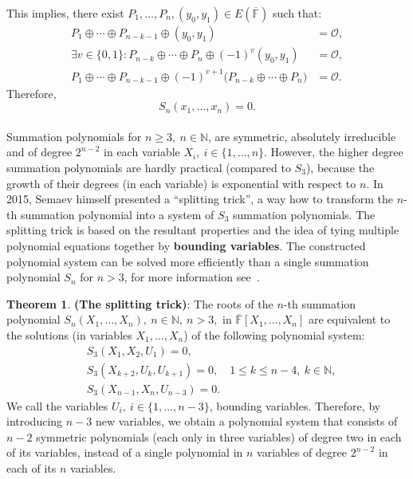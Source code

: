 \documentclass[thesis=M,english]{FITthesis}[2012/10/20]
\theoremstyle{remark}
\theoremstyle{definition}
\newtheorem{theorem}{Theorem}[section]
\begin{document}
This implies, there exist $P_1,\ldots,P_n, (y_0, y_1) \in E(\overline{\mathbb{F}})$ such that:
\begin{align*}
P_1 \oplus \cdots \oplus P_{n-k-1} \oplus (y_0,y_1) &= \mathcal{O}, \\
\exists v \in \{0,1\}: P_{n-k} \oplus \cdots \oplus P_{n} \oplus (-1)^{v}(y_0,y_1) &= \mathcal{O}, \\
P_1 \oplus \cdots \oplus P_{n-k-1} \oplus (-1)^{v+1}\bigg(P_{n-k} \oplus \cdots \oplus P_{n}\bigg) &= \mathcal{O}.
\end{align*}
Therefore, 
$$
S_n(x_1,\ldots,x_n) = 0.
$$
\\
\noindent Summation polynomials for $n \geq 3,\ n \in \mathbb{N}$, are symmetric, absolutely irreducible and of degree $2^{n-2}$ in each variable $X_i,\ i \in \{1,\ldots,n\}$.
However, the higher degree summation polynomials are hardly practical (compared to $S_3$), because the growth of their degrees (in each variable) is exponential with respect to $n$. In 2015, Semaev himself presented a \enquote{splitting trick}, a way how to transform the $n$-th summation polynomial into a  system of $S_3$ summation polynomials. The splitting trick is based on the resultant properties and the idea of tying multiple polynomial equations together by \textbf{bounding variables}. The constructed polynomial system can be solved more efficiently than a single summation polynomial $S_n$ for $n > 3$, for more information see~\cite{semaev15}. 
\begin{theorem}\textbf{(The splitting trick)}: The roots of the $n$-th summation polynomial $S_n(X_1,\ldots,X_n),\ n \in \mathbb{N},\ n > 3,$ in $\overline{\mathbb{F}}[X_1,\ldots,X_n]$ are equivalent to the solutions (in variables $X_1,\ldots,X_n$) of the following polynomial system:
\begin{align*}
&S_3(X_1,X_2,U_1) = 0, \\
&S_3(X_{k+2}, U_{k}, U_{k+1}) = 0, \quad 1 \leq k \leq n-4,\ k \in \mathbb{N}, \\
&S_3(X_{n-1}, X_n, U_{n-3}) = 0.
\end{align*} 
We call the variables $U_i,\ i \in \{1, \ldots, n - 3\}$, bounding variables. Therefore, by introducing $n-3$ new variables, we obtain a polynomial system that consists of $n-2$ symmetric polynomials (each only in three variables) of degree two in each of its variables, instead of a single polynomial in $n$ variables of degree $2^{n-2}$ in each of its $n$ variables.
\end{theorem}
\end{document}
